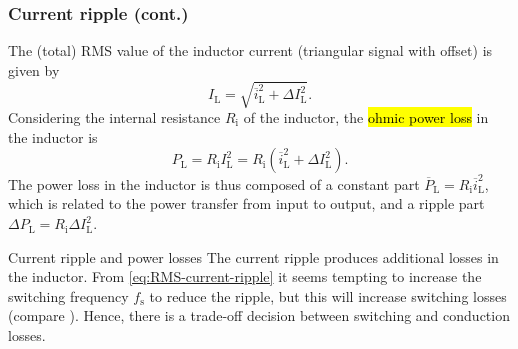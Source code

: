 \begin{frame}
    \frametitle{Current ripple (cont.)}
    The (total) RMS value of the inductor current (triangular signal with offset) is given by
    \begin{equation}
        I_\mathrm{L} = \sqrt{\overline{i}^2_\mathrm{L} + \Delta I^2_\mathrm{L}}.
    \end{equation}
    \pause
    Considering the internal resistance $R_\mathrm{i}$ of the inductor, the \hl{ohmic power loss} in the inductor is
    \begin{equation}
        P_\mathrm{L} = R_\mathrm{i} I^2_\mathrm{L} = R_\mathrm{i} \left(\overline{i}^2_\mathrm{L} + \Delta I^2_\mathrm{L}\right).
    \end{equation}
    \pause
    The power loss in the inductor is thus composed of a constant part $\overline{P}_\mathrm{L} = R_\mathrm{i} \overline{i}^2_\mathrm{L}$, which is related to the power transfer from input to output, and a ripple part $\Delta P_\mathrm{L} = R_\mathrm{i} \Delta I^2_\mathrm{L}$.   
    \pause%
    \begin{varblock}{Current ripple and power losses}
        The current ripple produces additional losses in the inductor. From \eqref{eq:RMS-current-ripple} it seems tempting to increase the switching frequency $f_\mathrm{s}$ to reduce the ripple, but this will increase switching losses (compare ). Hence, there is a trade-off decision between switching and conduction losses.
    \end{varblock}
\end{frame}

